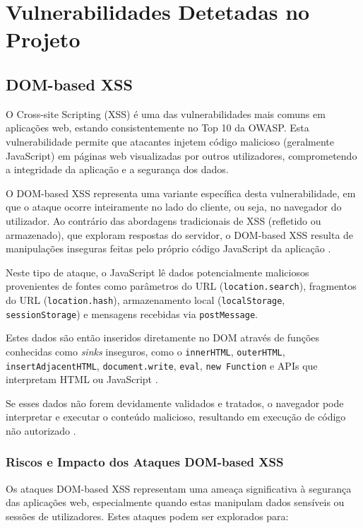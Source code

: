\section{Vulnerabilidades Detetadas no Projeto}
\label{sec:vulnerabilidades-detetadas}

\subsection{DOM-based XSS}
\label{subsec:dom-based-xss}

O Cross-site Scripting (XSS) é uma das vulnerabilidades mais comuns em aplicações web, estando consistentemente no Top 10 da OWASP. Esta vulnerabilidade permite que atacantes injetem código malicioso (geralmente JavaScript) em páginas web visualizadas por outros utilizadores, comprometendo a integridade da aplicação e a segurança dos dados.

O DOM-based XSS representa uma variante específica desta vulnerabilidade, em que o ataque ocorre inteiramente no lado do cliente, ou seja, no navegador do utilizador. Ao contrário das abordagens tradicionais de XSS (refletido ou armazenado), que exploram respostas do servidor, o DOM-based XSS resulta de manipulações inseguras feitas pelo próprio código JavaScript da aplicação \cite{ref30}.

Neste tipo de ataque, o JavaScript lê dados potencialmente maliciosos provenientes de fontes como parâmetros do URL (\texttt{location.search}), fragmentos do URL (\texttt{location.hash}), armazenamento local (\texttt{localStorage}, \texttt{sessionStorage}) e mensagens recebidas via \texttt{postMessage}.

Estes dados são então inseridos diretamente no DOM através de funções conhecidas como \textit{sinks} inseguros, como o \texttt{innerHTML}, \texttt{outerHTML}, \texttt{insertAdjacentHTML}, \texttt{document.write}, \texttt{eval}, \texttt{new Function} e APIs que interpretam HTML ou JavaScript \cite{ref31}.

Se esses dados não forem devidamente validados e tratados, o navegador pode interpretar e executar o conteúdo malicioso, resultando em execução de código não autorizado \cite{ref29}.

\subsubsection{Riscos e Impacto dos Ataques DOM-based XSS}
\label{subsubsec:riscos-impacto-dom-xss}

Os ataques DOM-based XSS representam uma ameaça significativa à segurança das aplicações web, especialmente quando estas manipulam dados sensíveis ou sessões de utilizadores. Estes ataques podem ser explorados para:

